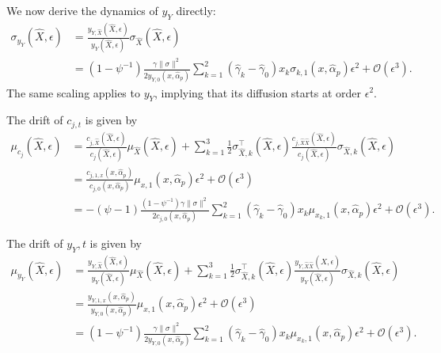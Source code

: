 \noindent
We now derive the dynamics of $y_Y$ directly:
\begin{align}\label{eq:sig-y2}
    \sigma_{y_Y}(\hat{X},\epsilon) &= \frac{y_{Y,\hat{X}}(\hat{X},\epsilon)}{y_{Y}(\hat{X},\epsilon)} \sigma_{\hat{X}}(\hat{X},\epsilon) \nonumber\\
    &= \left(1-\psi^{-1}\right)\frac{\gamma\|\sigma\|^2}{2 y_{Y,0}(x, \hat{\alpha}_p)} \sum_{k=1}^2 \left( \hat{\gamma}_k - \hat{\gamma}_0  \right) x_k \sigma_{k,1}(x, \hat{\alpha}_p)  \epsilon^2 + \mathcal{O}(\epsilon^3).
\end{align}
The same scaling applies to $y_Y$, implying that its diffusion starts at order $\epsilon^2$.

The drift of $c_{j,t}$ is given by\small
\begin{align}
    \mu_{c_j}(\hat{X},\epsilon) &= \frac{c_{j,\hat{X}}(\hat{X},\epsilon)}{c_j(\hat{X},\epsilon)} \mu_{\hat{X}}(\hat{X},\epsilon)+ \sum_{k=1}^3\frac{1}{2}  \sigma_{\hat{X},k}^\top(\hat{X},\epsilon) \frac{c_{j,\hat{X}\hat{X}}(\hat{X},\epsilon)}{c_{j}(\hat{X},\epsilon)} \sigma_{\hat{X},k}(\hat{X},\epsilon)\nonumber\\
    &=  \frac{c_{j,1,x}(x, \hat{\alpha}_p)}{c_{j,0}(x, \hat{\alpha}_p)} \mu_{x,1}(x, \hat{\alpha}_p) \epsilon^2+\mathcal{O}(\epsilon^3)\nonumber\\
    &= -(\psi-1)\frac{\left(1-\psi^{-1}\right)\gamma \|\sigma\|^2}{2 c_{j,0}(x, \hat{\alpha}_p)} \sum_{k=1}^2 \left( \hat{\gamma}_k - \hat{\gamma}_0  \right) x_k\mu_{x_k,1}(x, \hat{\alpha}_p) \epsilon^2+ \mathcal{O}(\epsilon^3).
\end{align}\normalsize

The drift of $y_Y,t$ is given by\small
\begin{align}
    \mu_{y_Y}(\hat{X},\epsilon) &= \frac{y_{Y,\hat{X}}(\hat{X},\epsilon)}{y_{Y}(\hat{X},\epsilon)} \mu_{\hat{X}}(\hat{X},\epsilon)+ \sum_{k=1}^3\frac{1}{2}  \sigma_{\hat{X},k}^\top(\hat{X},\epsilon) \frac{y_{Y,\hat{X}\hat{X}}(\hat{X},\epsilon)}{y_{Y}(\hat{X},\epsilon)} \sigma_{\hat{X},k}(\hat{X},\epsilon)\nonumber\\
    &=  \frac{y_{Y,1,x}(x, \hat{\alpha}_p)}{y_{Y,0}(x, \hat{\alpha}_p)} \mu_{x,1}(x, \hat{\alpha}_p) \epsilon^2+\mathcal{O}(\epsilon^3)\nonumber\\
    &= \left(1-\psi^{-1}\right)\frac{\gamma \|\sigma\|^2}{2 y_{Y,0}(x, \hat{\alpha}_p)} \sum_{k=1}^2 \left( \hat{\gamma}_k - \hat{\gamma}_0  \right) x_k\mu_{x_k,1}(x, \hat{\alpha}_p) \epsilon^2+ \mathcal{O}(\epsilon^3).
\end{align}\normalsize


